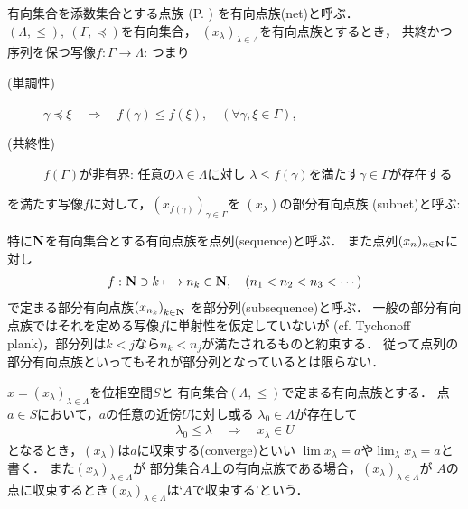 	\begin{screen}
		\begin{dfn}[有向点族]
			有向集合を添数集合とする点族
			(P. \pageref{dfn:family_collection})
			を有向点族(net)と呼ぶ．
			$(\Lambda,\leq),\ (\Gamma,\preceq)$を有向集合，
			$(x_\lambda)_{\lambda \in \Lambda}$を有向点族とするとき，
			共終かつ序列を保つ写像$f:\Gamma \longrightarrow \Lambda$:
			つまり
			\begin{description}
				\item[(単調性)] $\gamma \preceq \xi \quad \Longrightarrow \quad
					f(\gamma) \leq f(\xi),\quad (\forall \gamma,\xi \in \Gamma)$,
				\item[(共終性)] $f(\Gamma)$が非有界:
					任意の$\lambda \in \Lambda$に対し
					$\lambda \leq f(\gamma)$を満たす$\gamma \in \Gamma$が存在する
			\end{description}
			を満たす写像$f$に対して，$\left(x_{f(\gamma)}\right)_{\gamma \in \Gamma}$を
			$(x_\lambda)$の部分有向点族
			(subnet)と呼ぶ:
		\end{dfn}
	\end{screen}
	特に$\mathbf{N}$を有向集合とする有向点族を点列(sequence)と呼ぶ．
	また点列$(x_n)_{n \in \mathbf{N}}$に対し
	\begin{align}
		f:\mathbf{N} \ni k \longmapsto n_k \in \mathbf{N},
		\quad (n_1 < n_2 < n_3 < \cdots)
	\end{align}
	で定まる部分有向点族$\left(x_{n_k}\right)_{k \in \mathbf{N}}$
	を部分列(subsequence)と呼ぶ．
	一般の部分有向点族ではそれを定める写像$f$に単射性を仮定していないが
	(cf. Tychonoff plank)，部分列は$k < j$なら$n_k < n_j$が満たされるものと約束する．
	従って点列の部分有向点族といってもそれが部分列となっているとは限らない．
	
	\begin{screen}
		\begin{dfn}
			$x = (x_\lambda)_{\lambda \in \Lambda}$を位相空間$S$と
			有向集合$(\Lambda,\leq)$で定まる有向点族とする．
			点$a \in S$において，$a$の任意の近傍$U$に対し或る
			$\lambda_0 \in \Lambda$が存在して
			\begin{align}
				\lambda_0 \leq \lambda \quad \Longrightarrow \quad
				x_\lambda \in U
			\end{align}
			となるとき，$(x_\lambda)$は$a$に収束する(converge)といい
			$\lim x_\lambda = a$や$\lim_{\lambda} x_\lambda = a$と書く．
			また$(x_\lambda)_{\lambda \in \Lambda}$が
			部分集合$A$上の有向点族である場合，$(x_\lambda)_{\lambda \in \Lambda}$が
			$A$の点に収束するとき$(x_\lambda)_{\lambda \in \Lambda}$は`$A$で収束する'という．
		\end{dfn}
	\end{screen}
	
